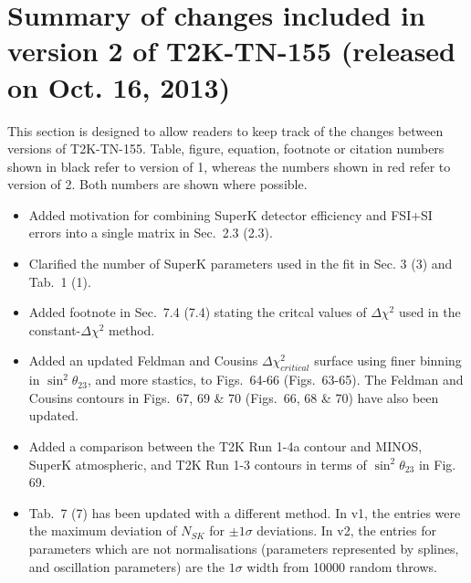 \clearpage

\section{Summary of changes included in version 2 of T2K-TN-155 (released on Oct. 16, 2013)}

This section is designed to allow readers to keep track of the changes between versions of T2K-TN-155.
Table, figure, equation, footnote or citation numbers shown in black refer to version of 1,
{\color{red}whereas the numbers shown in red refer to version of 2}.
Both numbers are shown where possible.

\begin{itemize}


\item Added motivation for combining SuperK detector efficiency and FSI+SI errors
  into a single matrix in Sec.\ 2.3 {\color{red}(2.3)}.

\item Clarified the number of SuperK parameters used in the fit in Sec. 3 {\color{red}(3)} and
  Tab.\ 1 {\color{red}(1)}.
  
\item Added footnote in Sec.\ 7.4 {\color{red}(7.4)} stating the critcal values of
  $\Delta\chi^2$ used in the constant-$\Delta\chi^2$ method.

\item Added an updated Feldman and Cousins $\Delta\chi^2_{critical}$ surface using
  finer binning in $\sin^2\theta_{23}$, and more stastics, to Figs.\ 64-66 {\color{red}(Figs.\ 63-65)}.
  The Feldman and Cousins contours in Figs.\ 67, 69 \& 70 {\color{red}(Figs.\ 66, 68 \& 70)}
  have also been updated.

\item Added a comparison between the T2K Run 1-4a contour and MINOS, SuperK atmospheric, and T2K Run 1-3 contours
  in terms of $\sin^2\theta_{23}$ in {Fig. 69}.
  

\item Tab.\ 7 {\color{red}(7)} has been updated with a different method.
  In v1, the entries were the maximum deviation of $N_{SK}$ for $\pm1\sigma$ deviations.
  In v2, the entries for parameters which are not normalisations (parameters represented by splines,
  and oscillation parameters) 
  are the $1\sigma$ width from 10000 random throws.


\end{itemize}
